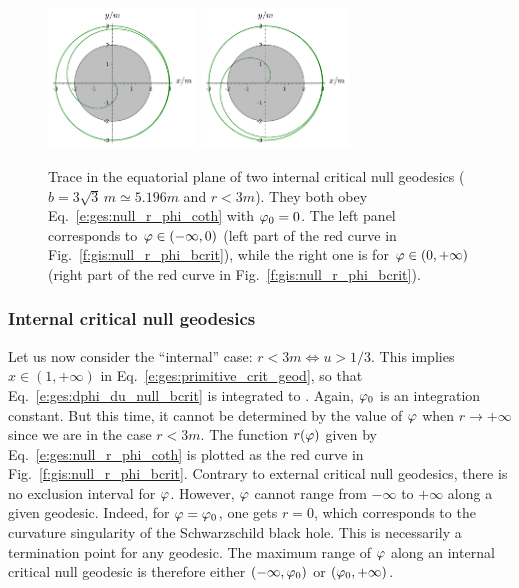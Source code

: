 \begin{figure}
\centerline{
\includegraphics[width=0.35\textwidth]{ges_null_b_crit_intern_1.pdf}\qquad
\includegraphics[width=0.35\textwidth]{ges_null_b_crit_intern_2.pdf}
}
\caption[]{\label{f:gis:null_b_crit_intern} \footnotesize
Trace in the equatorial plane of two internal critical null geodesics ($b = 3\sqrt{3} \, m \simeq 5.196 m$ and
$r<3m$). They both obey Eq.~\eqref{e:ges:null_r_phi_coth} with $\varphi_0 = 0$.
The left panel corresponds to $\varphi\in (-\infty, 0)$ (left part of the red curve
in Fig.~\ref{f:gis:null_r_phi_bcrit}), while the right one is
for $\varphi\in (0, +\infty)$ (right part of the red curve
in Fig.~\ref{f:gis:null_r_phi_bcrit}).}
\end{figure}


\subsubsection{Internal critical null geodesics}

Let us now consider the ``internal'' case: $r< 3m \iff u>1/3$.
This implies $x\in (1,+\infty)$ in Eq.~\eqref{e:ges:primitive_crit_geod},
so that Eq.~\eqref{e:ges:dphi_du_null_bcrit} is integrated to
\be \label{e:ges:null_r_phi_coth}
    .
\ee
Again, $\varphi_0$ is an integration constant. But this time, it cannot be determined by the
value of $\varphi$ when $r\to +\infty$ since we are in the case $r<3m$.
The function $r(\varphi)$ given by Eq.~\eqref{e:ges:null_r_phi_coth} is plotted as the red
curve in Fig.~\ref{f:gis:null_r_phi_bcrit}. Contrary to external critical null geodesics, there
is no exclusion interval for $\varphi$. However, $\varphi$ cannot range from $-\infty$
to $+\infty$ along a given geodesic. Indeed, for $\varphi=\varphi_0$, one gets
$r=0$, which corresponds to the curvature singularity of the Schwarzschild black hole.
This is necessarily a termination point for any geodesic. The maximum
range of $\varphi$ along an internal critical null geodesic is therefore
either $(-\infty,\varphi_0)$ or $(\varphi_0,+\infty)$.

